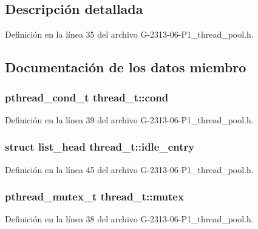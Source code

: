 \subsection{Descripción detallada}


Definición en la línea 35 del archivo G-\/2313-\/06-\/\+P1\+\_\+thread\+\_\+pool.\+h.



\subsection{Documentación de los datos miembro}
\hypertarget{structthread__t_a6cb846b84c59d01a8b3a2693d39a4af1}{}
\subsubsection[{cond}]{\setlength{\rightskip}{0pt plus 5cm}pthread\+\_\+cond\+\_\+t thread\+\_\+t\+::cond}\label{structthread__t_a6cb846b84c59d01a8b3a2693d39a4af1}


Definición en la línea 39 del archivo G-\/2313-\/06-\/\+P1\+\_\+thread\+\_\+pool.\+h.

\hypertarget{structthread__t_a9386032d478cacdfd680d5691e0eb9d3}{}
\subsubsection[{idle\+\_\+entry}]{\setlength{\rightskip}{0pt plus 5cm}struct {\bf list\+\_\+head} thread\+\_\+t\+::idle\+\_\+entry}\label{structthread__t_a9386032d478cacdfd680d5691e0eb9d3}


Definición en la línea 45 del archivo G-\/2313-\/06-\/\+P1\+\_\+thread\+\_\+pool.\+h.

\hypertarget{structthread__t_abb0dcb82ff12b61776b74c76fa27c964}{}
\subsubsection[{mutex}]{\setlength{\rightskip}{0pt plus 5cm}pthread\+\_\+mutex\+\_\+t thread\+\_\+t\+::mutex}\label{structthread__t_abb0dcb82ff12b61776b74c76fa27c964}


Definición en la línea 38 del archivo G-\/2313-\/06-\/\+P1\+\_\+thread\+\_\+pool.\+h.

